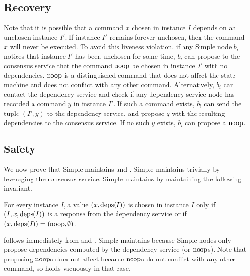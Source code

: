 \subsection{Recovery}
Note that it is possible that a command $x$ chosen in instance $I$ depends on
an unchosen instance $I'$. If instance $I'$ remains forever unchosen, then the
command $x$ will never be executed. To avoid this liveness violation, if any
Simple \BPaxos{} node $b_i$ notices that instance $I'$ has been unchosen for some
time, $b_i$ can propose to the consensus service that the command $\text{noop}$ be
chosen in instance $I'$ with no dependencies. $\text{noop}$ is a distinguished
command that does not affect the state machine and does not conflict with any
other command.
%
Alternatively, $b_i$ can contact the dependency service and check if any
dependency service node has recorded a command $y$ in instance $I'$. If such a
command exists, $b_i$ can send the tuple $(I', y)$ to the dependency service,
and propose $y$ with the resulting dependencies to the consensus service. If no
such $y$ exists, $b_i$ can propose a $\text{noop}$.

\subsection{Safety}
We now prove that Simple \BPaxos{} maintains  and
.
%
Simple \BPaxos{} maintains  trivially by leveraging the
consensus service. Simple \BPaxos{} maintains  by
maintaining the following invariant.

\begin{invariant}
  For every instance $I$, a value $(x, \text{deps}(I))$ is chosen in instance $I$
  only if $(I, x, \text{deps}(I))$ is a response from the dependency service or if
  $(x, \text{deps}(I)) = (\text{noop}, \emptyset)$.
\end{invariant}

 follows immediately from 
and . Simple \BPaxos{} maintains
 because Simple \BPaxos{} nodes only propose
dependencies computed by the dependency service (or $\text{noop}$s). Note that
proposing $\text{noop}$s does not affect  because
$\text{noop}$s do not conflict with any other command, so 
holds vacuously in that case.
